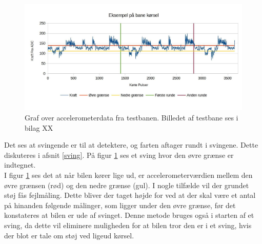\begin{figure}[h!]
\centering
\includegraphics[scale=0.25]{./Graphics/banekorsel}
\caption{Graf over accelerometerdata fra testbanen. Billedet af testbane ses i bilag XX}
\label{testbanegraf}
\end{figure}


Det ses at svingende er til at detektere, og farten aftager rundt i svingene. Dette diskuteres i afsnit \ref{sving}. På figur \ref{testbanegraf} ses et sving hvor den øvre grænse er indtegnet.\\



I figur \ref{testbanegraf} ses det at når bilen kører lige ud, er accelerometerværdien mellem den øvre grænsen (rød) og den nedre grænse (gul). I nogle tilfælde vil der grundet støj fås fejlmåling. Dette bliver der taget højde for ved at der skal være et antal på hinanden følgende målinger, som ligger under den øvre grænse, før det konstateres at bilen er ude af svinget. Denne metode bruges også i starten af et sving, da dette vil eliminere muligheden for at bilen tror den er i et sving, hvis der blot er tale om støj ved ligeud kørsel.\\



